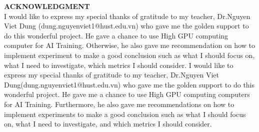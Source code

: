 \textbf{ACKNOWLEDGMENT} \\ 
I would like to express my special thanks of gratitude to my teacher, Dr.Nguyen Viet Dung (dung.nguyenviet1@hust.edu.vn) who gave me the golden support to do this wonderful project. He gave a chance to use High GPU computing computer for AI Training. Otherwise, he also gave me recommendation on how to implement experiment to make a good conclusion such as what I should focus on, what I need to investigate, which metrics I should consider.  
I would like to express my special thanks of gratitude to my teacher, Dr.Nguyen Viet Dung(dung.nguyenviet1@hust.edu.vn) who gave me the golden support to do this wonderful project. He gave me a chance to use High GPU computing computers for AI Training. Furthermore, he also gave me recommendations on how to implement experiments to make a good conclusion such as what I should focus on, what I need to investigate, and which metrics I should consider.  
